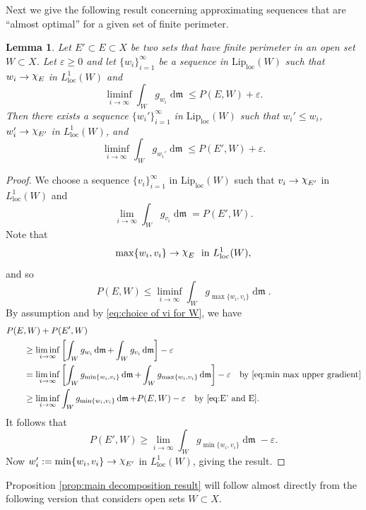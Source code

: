 \documentclass[11pt]{article}
\numberwithin{equation}{section}
\theoremstyle{plain}
\newtheorem{lemma}[equation]{Lemma}
\theoremstyle{definition}
\numberwithin{equation}{section}
\newcommand{\eps}{\varepsilon}
\newcommand{\loc}{\mathrm{loc}}
\newcommand{\liploc}{\mathrm{Lip}_{\mathrm{loc}}}
\newcommand{\ch}{\text{\raise 1.3pt \hbox{$\chi$}\kern-0.2pt}}
\DeclareMathOperator{\dfrm}{d\mathfrak{m}}
\begin{document}
Next we give the following result concerning approximating sequences that are
``almost optimal'' for a given set of finite perimeter.

\begin{lemma}\label{lem:almost optimal sequences}
Let $E'\subset E\subset X$ be two sets that have finite perimeter in an
open set $W\subset X$. Let $\eps\ge 0$ and
let $\{w_i\}_{i=1}^{\infty}$ be a sequence in $\liploc(W)$
such that $w_i\to \ch_E$ in $L^1_{\loc}(W)$ and
\[
\liminf_{i\to\infty}\int_{W}g_{w_i}\dfrm\le P(E,W)+\eps.
\] 
Then there exists a sequence $\{w_i'\}_{i=1}^{\infty}$ in $\liploc(W)$
such that $w_i'\le w_i$, $w_i'\to \ch_{E'}$ in $L^1_{\loc}(W)$, and
\[
\liminf_{i\to\infty}\int_{W}g_{w_i'}\dfrm \le P(E',W)+\eps.
\] 
\end{lemma}

\begin{proof}
	We choose a sequence $\{v_i\}_{i=1}^{\infty}$ in $\liploc(W)$
	such that $v_i\to \ch_{E'}$ in $L^1_{\loc}(W)$ and
	\begin{equation}\label{eq:choice of vi for W}
	\lim_{i\to\infty}\int_{W}g_{v_i}\dfrm= P(E',W).
	\end{equation}
Note that
\[
\max\{w_i,v_i\}\to \ch_E\ \textrm{ in }L^1_{\loc}(W),
\]
and so
\begin{equation}\label{eq:E' and E}
P(E,W)\le \liminf_{i\to\infty}\int_W g_{\max\{w_i,v_i\}}\dfrm.
\end{equation}
By assumption and by \eqref{eq:choice of vi for W}, we have
\begin{align*}
&P(E,W)+P(E',W)\\
&\qquad \ge \liminf_{i\to\infty}\left[\int_W g_{w_i}\dfrm+\int_W g_{v_i}\dfrm\right]-\eps\\
&\qquad =\liminf_{i\to\infty}\left[\int_W g_{\min\{w_i,v_i\}}\dfrm+
\int_W g_{\max\{w_i,v_i\}}\dfrm\right]-\eps\quad\textrm{by }
\eqref{eq:min max upper gradient}\\
&\qquad \ge \liminf_{i\to\infty}\int_W g_{\min\{w_i,v_i\}}\dfrm+P(E,W)-\eps\quad\textrm{by }
\eqref{eq:E' and E}.
\end{align*}
It follows that
\[
P(E',W)\ge \lim_{i\to\infty}\int_W g_{\min\{w_i,v_i\}}\dfrm-\eps.
\]
Now $w_i':=\min\{w_i,v_i\}\to \ch_{E'}$ in $L^1_{\loc}(W)$, giving the result.
\end{proof}

Proposition \ref{prop:main decomposition result} will follow almost directly from the following version
that considers open sets $W\subset X$.
\end{document}
